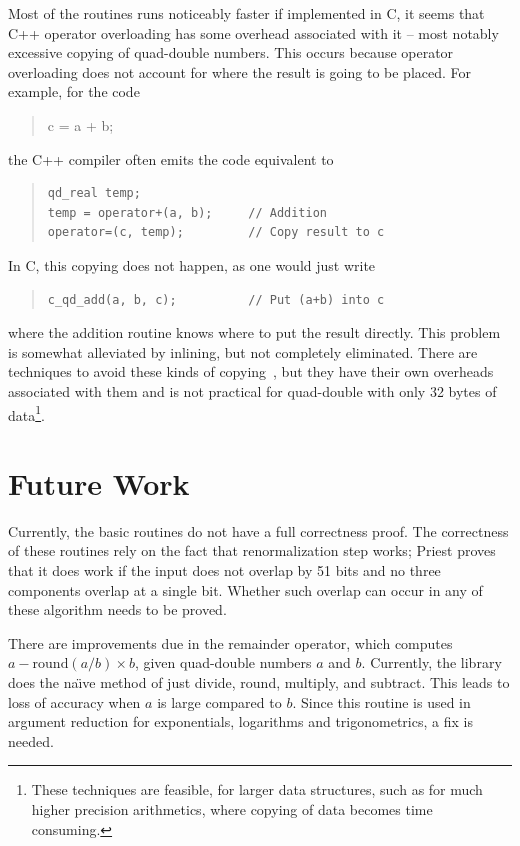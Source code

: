 \documentclass[11pt]{article}
\theoremstyle{definition}
\newcommand{\round}{\mathrm{round}}
\begin{document}
Most of the routines runs noticeably faster if implemented in C, 
it seems that C++ operator overloading has some overhead associated
with it -- most notably excessive copying of quad-double numbers.
This occurs because operator overloading does not account for
where the result is going to be placed.  For example, 
for the code 
\begin{quote}\begin{tt}c = a + b;\end{tt}\end{quote}
the C++ compiler often emits the code equivalent to
\begin{quote}\begin{tt}
\begin{verbatim}
qd_real temp;
temp = operator+(a, b);     // Addition
operator=(c, temp);         // Copy result to c
\end{verbatim}
\end{tt}\end{quote}
In C, this copying does not happen, as one would just write
\begin{quote}\begin{tt}\begin{verbatim}
c_qd_add(a, b, c);          // Put (a+b) into c
\end{verbatim}\end{tt}\end{quote}
where the addition routine knows where to put the result directly.
This problem is somewhat alleviated by inlining, but not completely
eliminated.  There are techniques to avoid these kinds of copying~\cite{c++}, 
but they have
their own overheads associated with them and is not practical for
quad-double with only 32 bytes of data\footnote{These techniques
are feasible, for larger data structures, such as for much higher
precision arithmetics, where copying of data becomes time consuming.}.

\section{Future Work} \label{sec:future}
Currently, the basic routines do not have a full correctness proof.
The correctness of these routines rely on the fact that renormalization
step works; Priest proves that it does work if the input does not overlap
by 51 bits and no three components overlap at a single bit.  Whether
such overlap can occur in any of these algorithm needs to be proved.

There are improvements due in the remainder operator, which computes
$a - \round(a/b) \times b$, given quad-double numbers $a$ and $b$.
Currently, the library does the na\"\i ve method of just divide, round, 
multiply, and subtract.  This leads to loss of accuracy when $a$ is large
compared to $b$.  Since this routine is used in argument reduction for
exponentials, logarithms and trigonometrics, a fix is needed.
\end{document}

